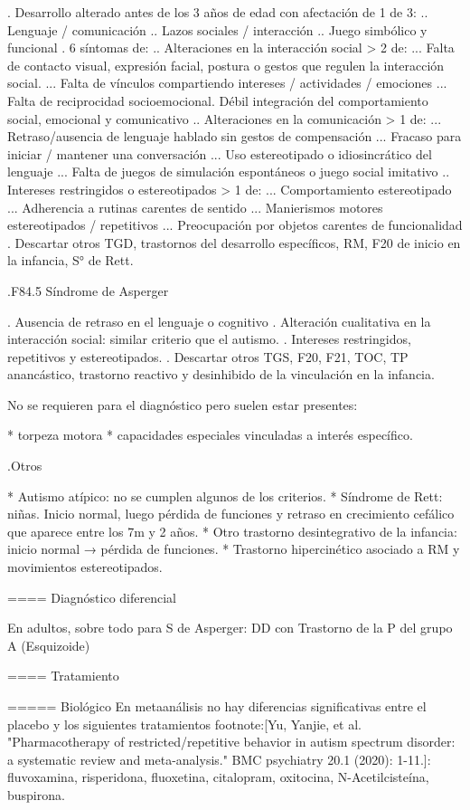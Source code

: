 \documentclass{scrbook}
\begin{document}
. Desarrollo alterado antes de los 3 años de edad con afectación de 1 de 3:
.. Lenguaje / comunicación
.. Lazos sociales / interacción
.. Juego simbólico y funcional
. 6 síntomas de:
.. Alteraciones en la interacción social > 2 de:
... Falta de contacto visual, expresión facial, postura o gestos que regulen la interacción social.
... Falta de vínculos compartiendo intereses / actividades / emociones
... Falta de reciprocidad socioemocional. Débil integración del comportamiento social, emocional y comunicativo
.. Alteraciones en la comunicación > 1 de:
... Retraso/ausencia de lenguaje hablado sin gestos de compensación
... Fracaso para iniciar / mantener una conversación
... Uso estereotipado o idiosincrático del lenguaje
... Falta de juegos de simulación espontáneos o juego social imitativo
.. Intereses restringidos o estereotipados > 1 de:
... Comportamiento estereotipado
... Adherencia a rutinas carentes de sentido
... Manierismos motores estereotipados / repetitivos
... Preocupación por objetos carentes de funcionalidad
. Descartar otros TGD, trastornos del desarrollo específicos, RM, F20 de inicio en la infancia, S° de Rett.

.F84.5 Síndrome de Asperger

. Ausencia de retraso en el lenguaje o cognitivo
. Alteración cualitativa en la interacción social: similar criterio que el autismo.
. Intereses restringidos, repetitivos y estereotipados.
. Descartar otros TGS, F20, F21, TOC, TP anancástico, trastorno reactivo y desinhibido de la vinculación en la infancia.

No se requieren para el diagnóstico pero suelen estar presentes:

* torpeza motora
* capacidades especiales vinculadas a interés específico.

.Otros

* Autismo atípico: no se cumplen algunos de los criterios.
* Síndrome de Rett: niñas. Inicio normal, luego pérdida de funciones y retraso en crecimiento cefálico que aparece entre los 7m y 2 años.
* Otro trastorno desintegrativo de la infancia: inicio normal → pérdida de funciones.
* Trastorno hipercinético asociado a RM y movimientos estereotipados.


==== Diagnóstico diferencial

En adultos, sobre todo para S de Asperger: DD con Trastorno de la P del grupo A (Esquizoide)

==== Tratamiento

===== Biológico
En metaanálisis no hay diferencias significativas entre el placebo y los siguientes tratamientos footnote:[Yu, Yanjie, et al. "Pharmacotherapy of restricted/repetitive behavior in autism spectrum disorder: a systematic review and meta-analysis." BMC psychiatry 20.1 (2020): 1-11.]: fluvoxamina, risperidona, fluoxetina, citalopram, oxitocina, N-Acetilcisteína, buspirona.
\end{document}
